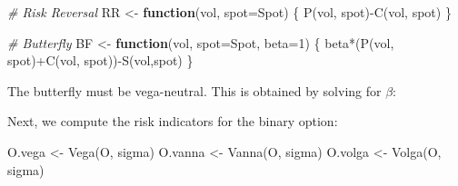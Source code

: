 \documentclass[]{tufte-book}
\newenvironment{Shaded}{}{}
\newcommand{\AttributeTok}[1]{\textcolor[rgb]{0.49,0.56,0.16}{#1}}
\newcommand{\CommentTok}[1]{\textcolor[rgb]{0.38,0.63,0.69}{\textit{#1}}}
\newcommand{\ControlFlowTok}[1]{\textcolor[rgb]{0.00,0.44,0.13}{\textbf{#1}}}
\newcommand{\DecValTok}[1]{\textcolor[rgb]{0.25,0.63,0.44}{#1}}
\newcommand{\FloatTok}[1]{\textcolor[rgb]{0.25,0.63,0.44}{#1}}
\newcommand{\FunctionTok}[1]{\textcolor[rgb]{0.02,0.16,0.49}{#1}}
\newcommand{\NormalTok}[1]{#1}
\newcommand{\OtherTok}[1]{\textcolor[rgb]{0.00,0.44,0.13}{#1}}
\newcommand{\SpecialCharTok}[1]{\textcolor[rgb]{0.25,0.44,0.63}{#1}}
\begin{document}
\begin{Shaded}
\begin{Highlighting}[]
  \CommentTok{\# Risk Reversal}
\NormalTok{  RR }\OtherTok{\textless{}{-}} \ControlFlowTok{function}\NormalTok{(vol, }\AttributeTok{spot=}\NormalTok{Spot) \{}
    \FunctionTok{P}\NormalTok{(vol, spot)}\SpecialCharTok{{-}}\FunctionTok{C}\NormalTok{(vol, spot)}
\NormalTok{  \}}

  \CommentTok{\# Butterfly}
\NormalTok{  BF }\OtherTok{\textless{}{-}} \ControlFlowTok{function}\NormalTok{(vol, }\AttributeTok{spot=}\NormalTok{Spot, }\AttributeTok{beta=}\DecValTok{1}\NormalTok{) \{}
\NormalTok{    beta}\SpecialCharTok{*}\NormalTok{(}\FunctionTok{P}\NormalTok{(vol, spot)}\SpecialCharTok{+}\FunctionTok{C}\NormalTok{(vol, spot))}\SpecialCharTok{{-}}\FunctionTok{S}\NormalTok{(vol,spot)}
\NormalTok{  \}}
\end{Highlighting}
\end{Shaded}

The butterfly must be vega-neutral. This is obtained by solving for
\(\beta\):

\begin{Shaded}
\end{Shaded}

Next, we compute the risk indicators for the binary option:

\begin{Shaded}
\begin{Highlighting}[]
\NormalTok{  O.vega }\OtherTok{\textless{}{-}} \FunctionTok{Vega}\NormalTok{(O, sigma)}
\NormalTok{  O.vanna }\OtherTok{\textless{}{-}} \FunctionTok{Vanna}\NormalTok{(O, sigma)}
\NormalTok{  O.volga }\OtherTok{\textless{}{-}} \FunctionTok{Volga}\NormalTok{(O, sigma)}
\end{Highlighting}
\end{Shaded}
\end{document}
